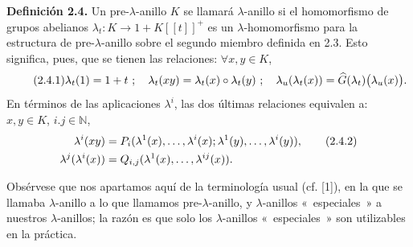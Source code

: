 \textbf{Definición 2.4.} Un pre-\(\lambda\)-anillo \(K\) se llamará \(\lambda\)-anillo si el homomorfismo de grupos abelianos \(\lambda_t:K\longrightarrow1+K[[t]]^+\) es un \(\lambda\)-homomorfismo para la estructura de pre-\(\lambda\)-anillo sobre el segundo miembro definida en 2.3. Esto significa, pues, que se tienen las relaciones: \(\forall x,y\in K\),
\begin{equation}\tag{2.4.1}
  \lambda_t(1)=1+t~;\quad
  \lambda_t(xy)=\lambda_t(x)\circ\lambda_t(y)~;\quad
  \lambda_u(\lambda_t(x))=\widehat G(\lambda_t)\bigl(\lambda_u(x)\bigr).
\end{equation}
En términos de las aplicaciones \(\lambda^i\), las dos últimas relaciones equivalen a: \(x,y\in K\), \(i.j\in\mathbb N\),
\begin{align}
  \lambda^i(xy)
  &=P_i(\lambda^1(x),\ldots,\lambda^i(x);
       \lambda^1(y),\ldots,\lambda^i(y)), \tag{2.4.2}\\
  \lambda^j(\lambda^i(x))
  &=Q_{i,j}(\lambda^1(x),\ldots,\lambda^{ij}(x)). \notag
\end{align}

Obsérvese que nos apartamos aquí de la terminología usual (cf. [1]), en la que se llamaba \(\lambda\)-anillo a lo que llamamos pre-\(\lambda\)-anillo, y \(\lambda\)-anillos «~especiales~» a nuestros \(\lambda\)-anillos; la razón es que solo los \(\lambda\)-anillos «~especiales~» son utilizables en la práctica.

